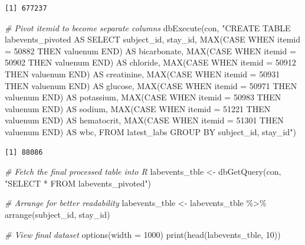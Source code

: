\documentclass[
]{article}
\newenvironment{Shaded}{\begin{snugshade}}{\end{snugshade}}
\newcommand{\AttributeTok}[1]{\textcolor[rgb]{0.77,0.63,0.00}{#1}}
\newcommand{\CommentTok}[1]{\textcolor[rgb]{0.56,0.35,0.01}{\textit{#1}}}
\newcommand{\DecValTok}[1]{\textcolor[rgb]{0.00,0.00,0.81}{#1}}
\newcommand{\FunctionTok}[1]{\textcolor[rgb]{0.00,0.00,0.00}{#1}}
\newcommand{\NormalTok}[1]{\textcolor[rgb]{0.00,0.00,0.00}{#1}}
\newcommand{\OtherTok}[1]{\textcolor[rgb]{0.56,0.35,0.01}{#1}}
\newcommand{\SpecialCharTok}[1]{\textcolor[rgb]{0.00,0.00,0.00}{#1}}
\newcommand{\StringTok}[1]{\textcolor[rgb]{0.31,0.60,0.02}{#1}}
\begin{document}
\begin{verbatim}
[1] 677237
\end{verbatim}

\begin{Shaded}
\begin{Highlighting}[]
\CommentTok{\# Pivot \textasciigrave{}itemid\textasciigrave{} to become separate columns}
\FunctionTok{dbExecute}\NormalTok{(con, }\StringTok{"CREATE TABLE labevents\_pivoted AS }
\StringTok{                SELECT subject\_id, stay\_id,}
\StringTok{                       MAX(CASE }
\StringTok{                       WHEN itemid = 50882 THEN valuenum END) AS bicarbonate,}
\StringTok{                       MAX(CASE }
\StringTok{                       WHEN itemid = 50902 THEN valuenum END) AS chloride,}
\StringTok{                       MAX(CASE }
\StringTok{                       WHEN itemid = 50912 THEN valuenum END) AS creatinine,}
\StringTok{                       MAX(CASE }
\StringTok{                       WHEN itemid = 50931 THEN valuenum END) AS glucose,}
\StringTok{                       MAX(CASE }
\StringTok{                       WHEN itemid = 50971 THEN valuenum END) AS potassium,}
\StringTok{                       MAX(CASE }
\StringTok{                       WHEN itemid = 50983 THEN valuenum END) AS sodium,}
\StringTok{                       MAX(CASE }
\StringTok{                       WHEN itemid = 51221 THEN valuenum END) AS hematocrit,}
\StringTok{                       MAX(CASE }
\StringTok{                       WHEN itemid = 51301 THEN valuenum END) AS wbc,}
\StringTok{                FROM latest\_labs}
\StringTok{                GROUP BY subject\_id, stay\_id"}\NormalTok{)}
\end{Highlighting}
\end{Shaded}

\begin{verbatim}
[1] 88086
\end{verbatim}

\begin{Shaded}
\begin{Highlighting}[]
\CommentTok{\# Fetch the final processed table into R}
\NormalTok{labevents\_tble }\OtherTok{\textless{}{-}} \FunctionTok{dbGetQuery}\NormalTok{(con, }\StringTok{"SELECT * FROM labevents\_pivoted"}\NormalTok{)}

\CommentTok{\# Arrange for better readability}
\NormalTok{labevents\_tble }\OtherTok{\textless{}{-}}\NormalTok{ labevents\_tble }\SpecialCharTok{\%\textgreater{}\%} \FunctionTok{arrange}\NormalTok{(subject\_id, stay\_id)}

\CommentTok{\# View final dataset}
\FunctionTok{options}\NormalTok{(}\AttributeTok{width =} \DecValTok{1000}\NormalTok{)}
\FunctionTok{print}\NormalTok{(}\FunctionTok{head}\NormalTok{(labevents\_tble, }\DecValTok{10}\NormalTok{))}
\end{Highlighting}
\end{Shaded}
\end{document}
